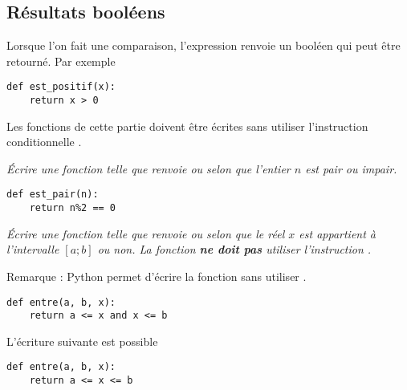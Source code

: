 \subsection{Résultats booléens} 
Lorsque l'on fait une comparaison, l'expression renvoie un booléen qui peut être retourné. Par exemple
\begin{lstlisting}
def est_positif(x):
    return x > 0
\end{lstlisting}
Les fonctions de cette partie doivent être écrites sans utiliser l'instruction conditionnelle .
\begin{Exercise}[title={Parité}]
\it Écrire une fonction  telle que  renvoie  ou  selon que l'entier $n$ est pair ou impair.
\end{Exercise}
\begin{Answer}
\begin{lstlisting}
def est_pair(n):
    return n%2 == 0
\end{lstlisting}
\end{Answer} 
\begin{Exercise}[title={Intervalle}]
\it Écrire une fonction  telle que  renvoie  ou  selon que le réel $x$ est appartient à l'intervalle $[a; b]$ ou non. La fonction {\bf ne doit pas} utiliser l'instruction .

Remarque : {\sc Python} permet d'écrire la fonction sans utiliser .
\end{Exercise}
\begin{Answer}
\begin{lstlisting}
def entre(a, b, x):
    return a <= x and x <= b
\end{lstlisting}

L'écriture suivante est possible 
\begin{lstlisting}
def entre(a, b, x):
    return a <= x <= b
\end{lstlisting}
\end{Answer} 
\medskip

